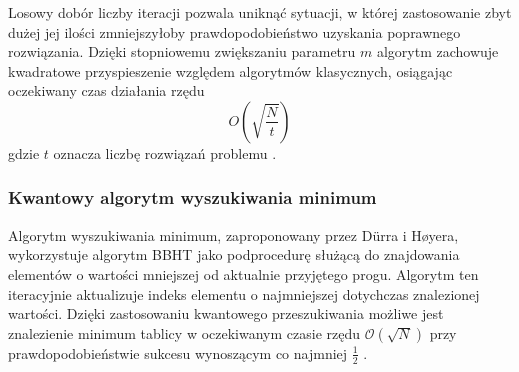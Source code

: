 Losowy dobór liczby iteracji pozwala uniknąć sytuacji, w której zastosowanie zbyt dużej jej ilości zmniejszyłoby prawdopodobieństwo uzyskania poprawnego rozwiązania. Dzięki stopniowemu zwiększaniu parametru $m$ algorytm zachowuje kwadratowe przyspieszenie względem algorytmów klasycznych, osiągając oczekiwany czas działania rzędu
\begin{equation}
\label{eq:bbht_time} 
O\left(\sqrt{\frac{N}{t}}\right)
\end{equation}
gdzie $t$ oznacza liczbę rozwiązań problemu \cite{bbht1996}.

\subsubsection{Kwantowy algorytm wyszukiwania minimum}

Algorytm wyszukiwania minimum, zaproponowany przez Dürra i Høyera, wykorzystuje algorytm BBHT jako podprocedurę służącą do znajdowania elementów o wartości mniejszej od aktualnie przyjętego progu. Algorytm ten iteracyjnie aktualizuje indeks elementu o najmniejszej dotychczas znalezionej wartości. Dzięki zastosowaniu kwantowego przeszukiwania możliwe jest znalezienie minimum tablicy w oczekiwanym czasie rzędu $\mathcal{O}(\sqrt{N})$ przy prawdopodobieństwie sukcesu wynoszącym co najmniej $\frac{1}{2}$ \cite{duerr1996}.

